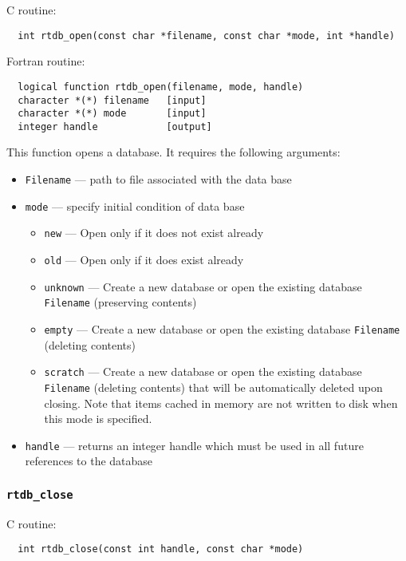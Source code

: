 C routine:

\begin{verbatim}
  int rtdb_open(const char *filename, const char *mode, int *handle)
\end{verbatim}


Fortran routine:

\begin{verbatim}
  logical function rtdb_open(filename, mode, handle)
  character *(*) filename   [input]
  character *(*) mode       [input]
  integer handle            [output]
\end{verbatim}
This function opens a database.  It requires the following arguments:
\begin{itemize}
\item    {\tt Filename} --- path to file associated with the data base
\item    {\tt mode} --- specify initial condition of data base
\begin{itemize}
\item {\tt new} ---  Open only if it does not exist already
\item {\tt old} ---  Open only if it does exist already
\item {\tt unknown} --- Create a new database or open the existing database {\tt Filename} (preserving contents)
\item {\tt empty} --- Create a new database or open the existing database {\tt Filename} (deleting contents)
\item {\tt scratch} --- Create a new database or open the existing database {\tt Filename} (deleting contents)
                         that will be automatically deleted upon closing.  Note that items
                         cached in memory are not written to disk when this mode is specified.
\end{itemize}
\item {\tt handle} --- returns an integer handle which must be used in all future
  references to the database
\end{itemize}

\subsubsection{{\tt rtdb\_close}}

C routine:

\begin{verbatim}
  int rtdb_close(const int handle, const char *mode)
\end{verbatim}


